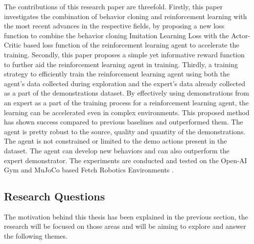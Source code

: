 The contributions of this research paper are threefold. Firstly, this paper investigates the combination of behavior cloning and reinforcement learning with the most recent advances in the respective fields, by proposing a new loss function to combine the behavior cloning Imitation Learning Loss \cite{goecks2020integrating} \cite{nair2018overcoming} with the Actor-Critic based loss function \cite{lillicrap2019continuous} \cite{fujimoto2018addressing} of the reinforcement learning agent to accelerate the training. Secondly, this paper proposes a simple yet informative reward function to further aid the reinforcement learning agent in training. Thirdly, a training strategy to efficiently train the reinforcement learning agent using both the agent's data collected during exploration and the expert's data already collected as a part of the demonstrations dataset. By effectively using demonstrations from an expert as a part of the training process for a reinforcement learning agent, the learning can be accelerated even in complex environments. This proposed method has shown success compared to previous baselines and outperformed them. The agent is pretty robust to the source, quality and quantity of the demonstrations. The agent is not constrained or limited to the demo actions present in the dataset. The agent can develop new behaviors and can also outperform the expert demonstrator. The experiments are conducted and tested on the Open-AI Gym \cite{brockman2016openai} and MuJoCo \cite{MJC} based Fetch Robotics Environments \cite{plappert2018multigoal}. \\

\newpage

\subsection{Research Questions}

The motivation behind this thesis has been explained in the previous section, the research will be focused on those areas and will be aiming to explore and answer the following themes. \\

